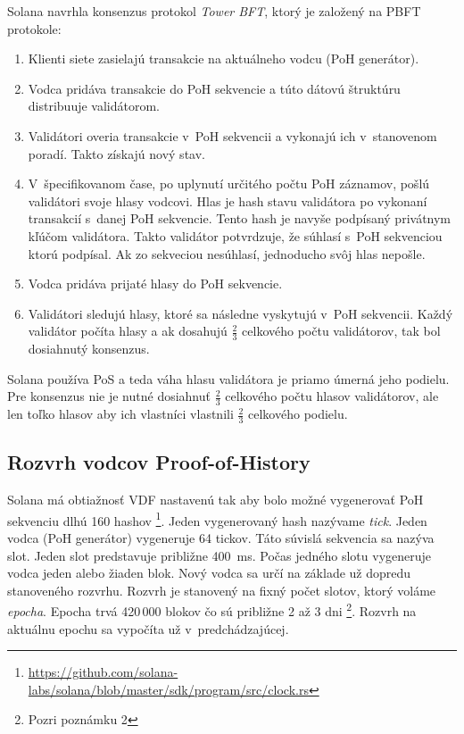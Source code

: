 Solana navrhla konsenzus protokol \textit{Tower BFT}, ktorý je založený na PBFT protokole:
\begin{enumerate}
	\item Klienti siete zasielajú transakcie na aktuálneho vodcu (PoH generátor).
	\item Vodca pridáva transakcie do PoH sekvencie a túto dátovú štruktúru distribuuje validátorom.
	\item Validátori overia transakcie v~PoH sekvencii a vykonajú ich v~stanovenom poradí. Takto získajú nový stav.
	\item V~špecifikovanom čase, po uplynutí určitého počtu PoH záznamov, pošlú validátori svoje hlasy vodcovi. Hlas je hash stavu validátora po vykonaní transakcií s~danej PoH sekvencie. Tento hash je navyše podpísaný privátnym kľúčom validátora. Takto validátor potvrdzuje, že súhlasí s~PoH sekvenciou ktorú podpísal. Ak zo sekveciou nesúhlasí, jednoducho svôj hlas nepošle.
	\item Vodca pridáva prijaté hlasy do PoH sekvencie.
	\item Validátori sledujú hlasy, ktoré sa následne vyskytujú v~PoH sekvencii. Každý validátor počíta hlasy a ak dosahujú $\frac{2}{3}$ celkového počtu validátorov, tak bol dosiahnutý konsenzus.
\end{enumerate}
Solana používa PoS a teda váha hlasu validátora je priamo úmerná jeho podielu. Pre konsenzus nie je nutné dosiahnuť $\frac{2}{3}$ celkového počtu hlasov validátorov, ale len toľko hlasov aby ich vlastníci vlastnili $\frac{2}{3}$ celkového podielu.

\subsection{Rozvrh vodcov Proof-of-History}\label{subsec:pos-generator}

Solana má obtiažnosť VDF nastavenú tak aby bolo možné vygenerovať PoH sekvenciu dlhú 160 hashov%
\footnote{\url{https://github.com/solana-labs/solana/blob/master/sdk/program/src/clock.rs}}. Jeden vygenerovaný hash nazývame \textit{tick}. Jeden vodca (PoH generátor) vygeneruje 64 tickov. Táto súvislá sekvencia sa nazýva slot. Jeden slot predstavuje približne 400 \,ms. Počas jedného slotu vygeneruje vodca jeden alebo žiaden blok. Nový vodca sa určí na základe už dopredu stanoveného rozvrhu. Rozvrh je stanovený na fixný počet slotov, ktorý voláme \textit{epocha}. Epocha trvá 420\,000 blokov čo sú približne 2 až 3 dni%
\footnote{Pozri poznámku 2}. Rozvrh na aktuálnu epochu sa vypočíta už v~predchádzajúcej. 

